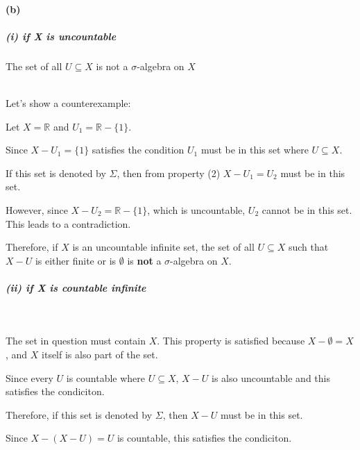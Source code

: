 \documentclass[12pt]{article}
\begin{document}
\paragraph{(b)}
\subparagraph{(i) if X is uncountable}
The set of all \( U \subseteq X \) is not a \(\sigma\)-algebra on \(X\) \\ \\
\par \hspace*{1em}Let's show a counterexample: \\
\par \hspace*{1em}Let \( X = \mathbb{R} \) and \( U_1 = \mathbb{R} - \{1\} \). \\
\par \hspace*{1em}Since \( X - U_1 = \{1\} \) satisfies the condition \( U_1 \) must be in this set where \( U \subseteq X \).\\
\par \hspace*{1em}If this set is denoted by \( \Sigma \), then from property (2) \( X - U_1 = U_2 \) must be in this set.\\

\par \hspace*{1em}However, since \( X - U_2 = \mathbb{R} - \{1\} \), which is uncountable, \( U_2 \) cannot be in this set. This leads to a contradiction.\\

\par \hspace*{1em}Therefore, if \( X \) is an uncountable infinite set, the set of all \( U \subseteq X \) such that \( X - U \) is either finite or is \(\emptyset\) is \textbf{not}  a \( \sigma \)-algebra on \( X \).\\

\subparagraph{(ii) if X is countable infinite}
\ \\
\par \hspace*{1em}The set in question must contain \(X\). This property is satisfied because \( X - \emptyset = X \), and \( X \) itself is also part of the set. \\
\par \hspace*{1em}Since every \(U\) is countable where \( U \subseteq X \), \(X-U\) is also uncountable and this satisfies the condiciton. \\
\par \hspace*{1em}Therefore, if this set is denoted by \( \Sigma \), then \( X-U \) must be in this set. \\
\par \hspace*{1em}Since \( X - (X-U) = U\) is countable, this satisfies the condiciton. \\ \\
\end{document}
